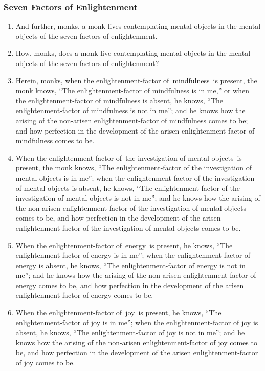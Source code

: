\documentclass[a4 paper, 12pt]{article}
\begin{document}
\subsubsection*{Seven Factors of Enlightenment}
\begin{enumerate}[resume]
\item And further, monks, a monk lives contemplating mental objects in the mental objects of the seven factors of enlightenment.
\item How, monks, does a monk live contemplating mental objects in the mental objects of the seven factors of enlightenment?
\item Herein, monks, when the enlightenment-factor of mindfulness is present, the monk knows, “The enlightenment-factor of mindfulness is in me,” or when the enlightenment-factor of mindfulness is absent, he knows, “The enlightenment-factor of mindfulness is not in me”; and he knows how the arising of the non-arisen enlightenment-factor of mindfulness comes to be; and how perfection in the development of the arisen enlightenment-factor of mindfulness comes to be.
\item When the enlightenment-factor of the investigation of mental objects is present, the monk knows, “The enlightenment-factor of the investigation of mental objects is in me”; when the enlightenment-factor of the investigation of mental objects is absent, he knows, “The enlightenment-factor of the investigation of mental objects is not in me”; and he knows how the arising of the non-arisen enlightenment-factor of the investigation of mental objects comes to be, and how perfection in the development of the arisen enlightenment-factor of the investigation of mental objects comes to be.
\item When the enlightenment-factor of energy is present, he knows, “The enlightenment-factor of energy is in me”; when the enlightenment-factor of energy is absent, he knows, “The enlightenment-factor of energy is not in me”; and he knows how the arising of the non-arisen enlightenment-factor of energy comes to be, and how perfection in the development of the arisen enlightenment-factor of energy comes to be.
\item When the enlightenment-factor of joy is present, he knows, “The enlightenment-factor of joy is in me”; when the enlightenment-factor of joy is absent, he knows, “The enlightenment-factor of joy is not in me”; and he knows how the arising of the non-arisen enlightenment-factor of joy comes to be, and how perfection in the development of the arisen enlightenment-factor of joy comes to be.

\end{enumerate}
\end{document}

